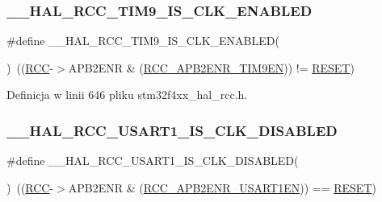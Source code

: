 \subsubsection{\texorpdfstring{\+\_\+\+\_\+\+H\+A\+L\+\_\+\+R\+C\+C\+\_\+\+T\+I\+M9\+\_\+\+I\+S\+\_\+\+C\+L\+K\+\_\+\+E\+N\+A\+B\+L\+ED}{\_\_HAL\_RCC\_TIM9\_IS\_CLK\_ENABLED}}
{\footnotesize\ttfamily \#define \+\_\+\+\_\+\+H\+A\+L\+\_\+\+R\+C\+C\+\_\+\+T\+I\+M9\+\_\+\+I\+S\+\_\+\+C\+L\+K\+\_\+\+E\+N\+A\+B\+L\+ED(\begin{DoxyParamCaption}{ }\end{DoxyParamCaption})~((\hyperlink{group___peripheral__declaration_ga74944438a086975793d26ae48d5882d4}{R\+CC}-\/$>$A\+P\+B2\+E\+NR \& (\hyperlink{group___peripheral___registers___bits___definition_ga987ebd8255dc8f9c09127e1d608d1065}{R\+C\+C\+\_\+\+A\+P\+B2\+E\+N\+R\+\_\+\+T\+I\+M9\+EN})) != \hyperlink{group___exported__types_gga89136caac2e14c55151f527ac02daaffa589b7d94a3d91d145720e2fed0eb3a05}{R\+E\+S\+ET})}



Definicja w linii 646 pliku stm32f4xx\+\_\+hal\+\_\+rcc.\+h.

\mbox{\label{group___r_c_c___a_p_b2___peripheral___clock___enable___disable___status_ga22c9d59ac6062298a71eed0d6a4a9afd}} 
\subsubsection{\texorpdfstring{\+\_\+\+\_\+\+H\+A\+L\+\_\+\+R\+C\+C\+\_\+\+U\+S\+A\+R\+T1\+\_\+\+I\+S\+\_\+\+C\+L\+K\+\_\+\+D\+I\+S\+A\+B\+L\+ED}{\_\_HAL\_RCC\_USART1\_IS\_CLK\_DISABLED}}
{\footnotesize\ttfamily \#define \+\_\+\+\_\+\+H\+A\+L\+\_\+\+R\+C\+C\+\_\+\+U\+S\+A\+R\+T1\+\_\+\+I\+S\+\_\+\+C\+L\+K\+\_\+\+D\+I\+S\+A\+B\+L\+ED(\begin{DoxyParamCaption}{ }\end{DoxyParamCaption})~((\hyperlink{group___peripheral__declaration_ga74944438a086975793d26ae48d5882d4}{R\+CC}-\/$>$A\+P\+B2\+E\+NR \& (\hyperlink{group___peripheral___registers___bits___definition_ga4666bb90842e8134b32e6a34a0f165f3}{R\+C\+C\+\_\+\+A\+P\+B2\+E\+N\+R\+\_\+\+U\+S\+A\+R\+T1\+EN})) == \hyperlink{group___exported__types_gga89136caac2e14c55151f527ac02daaffa589b7d94a3d91d145720e2fed0eb3a05}{R\+E\+S\+ET})}



